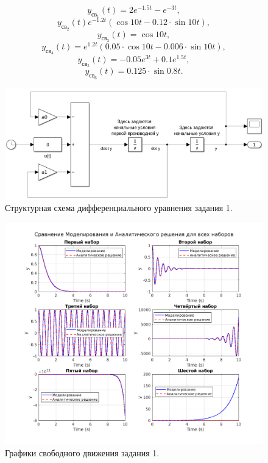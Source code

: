 \begin{equation}
    \label{eq:11}
    y_{\text{св}_1}(t)=2e^{-1.5t}-e^{-3t},
\end{equation}
\begin{equation}
    \label{eq:12}
    y_{\text{св}_2}(t)e^{-1.2t}(\cos 10t-0.12\cdot\sin 10t),
\end{equation}
\begin{equation}
    \label{eq:13}
    y_{\text{св}_3}(t)=\cos10t,
\end{equation}
\begin{equation}
    \label{eq:14}
    y_{\text{св}_4}(t)=e^{1.2t}(0.05\cdot\cos10t-0.006\cdot\sin10t),
\end{equation}
\begin{equation}
    \label{eq:15}
    y_{\text{св}_5}(t)=-0.05e^{3t}+0.1e^{1.5t},
\end{equation}
\begin{equation}
    \label{eq:16}
    y_{\text{св}_6}(t)=0.125\cdot\sin0.8t.
\end{equation}

\begin{figure}
    \centering
    \includegraphics[width=1\textwidth]{figs/task_1_slx.png}
    \caption{Структурная схема дифференциального уравнения задания 1.}
    \label{fig:task_1_slx}
\end{figure}
    
\begin{figure}
    \centering
    \includegraphics[width=1\textwidth]{figs/task_1_out.png}
    \caption{Графики свободного движения задания 1.}
    \label{fig:task_1_out}
\end{figure}


